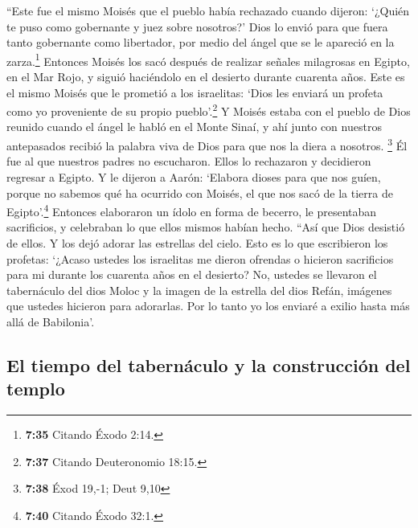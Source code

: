  ``Este fue el mismo Moisés que el pueblo había rechazado
cuando dijeron: `¿Quién te puso como gobernante y juez sobre nosotros?'
Dios lo envió para que fuera tanto gobernante como libertador, por medio
del ángel que se le apareció en la zarza.\footnote{\textbf{7:35} Citando
  Éxodo 2:14.}  Entonces Moisés los sacó después de
realizar señales milagrosas en Egipto, en el Mar Rojo, y siguió
haciéndolo en el desierto durante cuarenta años.  Este es
el mismo Moisés que le prometió a los israelitas: `Dios les enviará un
profeta como yo proveniente de su propio pueblo'.\footnote{\textbf{7:37}
  Citando Deuteronomio 18:15.}  Y Moisés estaba con el
pueblo de Dios reunido cuando el ángel le habló en el Monte Sinaí, y ahí
junto con nuestros antepasados recibió la palabra viva de Dios para que
nos la diera a nosotros. \footnote{\textbf{7:38} Éxod 19,-1; Deut 9,10}
 Él fue al que nuestros padres no escucharon. Ellos lo
rechazaron y decidieron regresar a Egipto.  Y le dijeron
a Aarón: `Elabora dioses para que nos guíen, porque no sabemos qué ha
ocurrido con Moisés, el que nos sacó de la tierra de Egipto'.\footnote{\textbf{7:40}
  Citando Éxodo 32:1.}  Entonces elaboraron un ídolo en
forma de becerro, le presentaban sacrificios, y celebraban lo que ellos
mismos habían hecho.  ``Así que Dios desistió de ellos. Y
los dejó adorar las estrellas del cielo. Esto es lo que escribieron los
profetas: `¿Acaso ustedes los israelitas me dieron ofrendas o hicieron
sacrificios para mi durante los cuarenta años en el desierto?
 No, ustedes se llevaron el tabernáculo del dios Moloc y
la imagen de la estrella del dios Refán, imágenes que ustedes hicieron
para adorarlas. Por lo tanto yo los enviaré a exilio hasta más allá de
Babilonia'.

\hypertarget{el-tiempo-del-tabernuxe1culo-y-la-construcciuxf3n-del-templo}{%
\subsection{El tiempo del tabernáculo y la construcción del
templo}\label{el-tiempo-del-tabernuxe1culo-y-la-construcciuxf3n-del-templo}}

